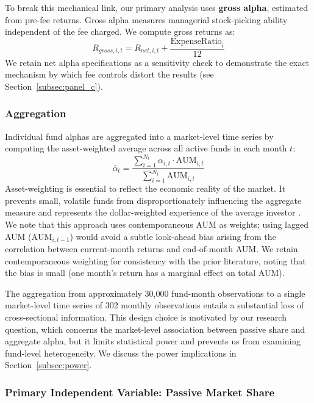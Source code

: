 \documentclass[11pt, a4paper]{article}
\begin{document}
To break this mechanical link, our primary analysis uses \textbf{gross alpha}, estimated from pre-fee returns. Gross alpha measures managerial stock-picking ability independent of the fee charged. We compute gross returns as:
\begin{equation}
    R_{gross,i,t} = R_{net,i,t} + \frac{\text{ExpenseRatio}_{i}}{12}
    \label{eq:gross}
\end{equation}
We retain net alpha specifications as a sensitivity check to demonstrate the exact mechanism by which fee controls distort the results (see Section~\ref{subsec:panel_c}).

\subsubsection{Aggregation}

Individual fund alphas are aggregated into a market-level time series by computing the asset-weighted average across all active funds in each month $t$:
\begin{equation}
    \bar{\alpha}_t = \frac{\sum_{i=1}^{N_t} \alpha_{i,t} \cdot \text{AUM}_{i,t}}{\sum_{i=1}^{N_t} \text{AUM}_{i,t}}
    \label{eq:aggregation}
\end{equation}
Asset-weighting is essential to reflect the economic reality of the market. It prevents small, volatile funds from disproportionately influencing the aggregate measure and represents the dollar-weighted experience of the average investor \parencite{french2008}. We note that this approach uses contemporaneous AUM as weights; using lagged AUM ($\text{AUM}_{i,t-1}$) would avoid a subtle look-ahead bias arising from the correlation between current-month returns and end-of-month AUM. We retain contemporaneous weighting for consistency with the prior literature, noting that the bias is small (one month's return has a marginal effect on total AUM).

The aggregation from approximately 30,000 fund-month observations to a single market-level time series of 302 monthly observations entails a substantial loss of cross-sectional information. This design choice is motivated by our research question, which concerns the market-level association between passive share and aggregate alpha, but it limits statistical power and prevents us from examining fund-level heterogeneity. We discuss the power implications in Section~\ref{subsec:power}.

\subsubsection{Primary Independent Variable: Passive Market Share}
\end{document}
